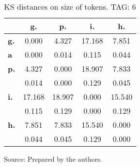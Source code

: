 \begin{table}[h!]
\begin{center}
\caption{KS distances on size of tokens. TAG: 6}
	\label{tab:kolTok}
\begin{tabular}{| l || c | c | c | c |}\hline
 & {\bf g.} & {\bf p.} & {\bf i.} & {\bf h.} \\\hline\hline
{\bf g.} & 0.000 & 4.327 & 17.168 & 7.851 \\
{\bf a } & 0.000 & 0.014 & 0.115 & 0.044 \\\hline
{\bf p.} & 4.327 & 0.000 & 18.907 & 7.833 \\
{\bf } & 0.014 & 0.000 & 0.129 & 0.045 \\\hline
{\bf i.} & 17.168 & 18.907 & 0.000 & 15.540 \\
{\bf } & 0.115 & 0.129 & 0.000 & 0.129 \\\hline
{\bf h.} & 7.851 & 7.833 & 15.540 & 0.000 \\
{\bf } & 0.044 & 0.045 & 0.129 & 0.000 \\\hline
\end{tabular}
\begin{flushleft}
		Source: Prepared by the authors.\
\end{flushleft}
\end{center}
\end{table}
